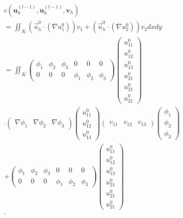 \documentclass{ctexart}
\begin{document}
\begin{align*}
    & c(\boldsymbol{u}_h^{(l-1)}, \boldsymbol{u}_h^{(l-1)}, \boldsymbol{v}_h) \\
    & = \iint_K (\vec{u}_h^0 \cdot (\nabla u_1^0)) v_1 + (\vec{u}_h^0 \cdot (\nabla u_2^0)) v_2dxdy\\
    & = \iint_K \begin{pmatrix}
      \phi_1&  \phi_2 &  \phi_3 & 0 & 0 & 0\\
      0 & 0 & 0 & \phi_1 & \phi_2 & \phi_3
    \end{pmatrix}
    \begin{pmatrix}
     u_{11}^0\\
     u_{12}^0\\
     u_{13}^0\\
     u_{21}^0\\
     u_{21}^0\\
     u_{21}^0
    \end{pmatrix} \\
    & \cdot 
    \begin{pmatrix}
     \nabla \phi_1 & \nabla \phi_2 & \nabla \phi_3
    \end{pmatrix}
    \begin{pmatrix}
     u_{11}^0\\
     u_{12}^0\\
     u_{13}^0
    \end{pmatrix}
    \begin{pmatrix}
     v_{11} & v_{12} & v_{13}
    \end{pmatrix}
    \begin{pmatrix}
     \phi_1\\
     \phi_2\\
    \phi_3
    \end{pmatrix}\\
    & + 
    \begin{pmatrix}
      \phi_1&  \phi_2 &  \phi_3 & 0 & 0 & 0\\
      0 & 0 & 0 & \phi_1 & \phi_2 & \phi_3
    \end{pmatrix}
    \begin{pmatrix}
     u_{11}^0\\
     u_{12}^0\\
     u_{13}^0\\
     u_{21}^0\\
     u_{21}^0\\
     u_{21}^0
    \end{pmatrix} \\
    & \cdot 

\end{align*}
\end{document}
